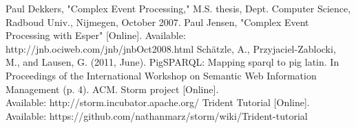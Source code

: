 \documentclass[conference, twocolumn, twoside, 11pt]{IEEEtran}
\theoremstyle{definition}
\begin{document}
\begin{thebibliography}{1}
        Paul Dekkers, "Complex Event Processing," M.S. thesis, Dept. Computer Science, Radboud Univ., Nijmegen, October 2007.
        Paul Jensen, "Complex Event Processing with Esper" [Online]. Available: http://jnb.ociweb.com/jnb/jnbOct2008.html
        Sch{\"a}tzle, A., Przyjaciel-Zablocki, M., and Lausen, G. (2011, June). PigSPARQL: Mapping sparql to pig latin. {In Proceedings of the International Workshop on Semantic Web Information Management} (p. 4). ACM.
        Storm project [Online]. \\Available: http://storm.incubator.apache.org/
        Trident Tutorial [Online]. \\Available: https://github.com/nathanmarz/storm/wiki/Trident-tutorial

\end{thebibliography}

\end{document}
